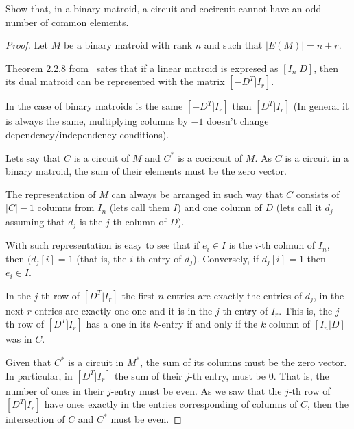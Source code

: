 \prob
{
    Show that, in a binary matroid, a circuit and cocircuit cannot have an odd number of common elements.
}
\begin{proof}
    Let $M$ be a binary matroid with rank $n$ and such that $|E(M)| = n + r$.\pn
    
    Theorem 2.2.8 from~\cite{Oxley} sates that if a linear matroid is expresed as $[I_n | D]$,
    then its dual matroid can be represented with the matrix $[-D^T | I_r]$.\pn
    
    In the case of binary matroids is the same $[-D^T | I_r]$ than $[D^T | I_r]$ (In general it is always the same, multiplying columns
    by $-1$ doesn't change dependency/independency conditions).\pn
    
    Lets say that $C$ is a circuit of $M$ and $C^*$ is a cocircuit of $M$. As $C$ is a circuit in a binary matroid, 
    the sum of their elements must be the zero vector.\pn
    
    The representation of $M$ can always be arranged in such way that $C$ consists of $|C|-1$ columns from $I_n$ (lets call them $I$) 
    and one column of $D$ (lets call it $d_j$ assuming that $d_j$ is the $j$-th column of $D$).\pn

    With such representation is easy to see that if $e_i \in I$ is the $i$-th colmun of $I_n$, then $(d_j[i] = 1$ (that is, the
    $i$-th entry of $d_j$). Conversely, if $d_j[i] = 1$ then $e_i \in I$.\pn
    
    In the $j$-th row of $[D^T|I_r]$ the first $n$ entries are exactly the entries of $d_j$, in the next $r$ entries are exactly
    one one and it is in the $j$-th entry of $I_r$. This is, the $j$-th row of $[D^T|I_r]$ has a one in its $k$-entry if and only
    if the $k$ column of $[I_n | D]$ was in $C$.\pn
    
    Given that $C^*$ is a circuit in $M^*$, the sum of its columns must be the zero vector. In particular, in $[D^T|I_r]$ the
    sum of their $j$-th entry, must be $0$. That is, the number of ones in their $j$-entry must be even. As we saw
    that the $j$-th row of $[D^T|I_r]$ have ones exactly in the entries corresponding of columns of $C$, then the intersection of
    $C$ and $C^*$ must be even.
\end{proof}